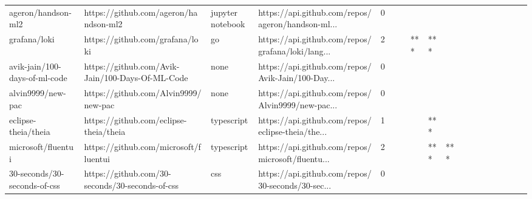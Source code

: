 \begin{tabular}{llllrlllllllllllll}
ageron/handson-ml2                                 &              https://github.com/ageron/handson-ml2 &  jupyter notebook &  https://api.github.com/repos/ageron/handson-ml... &       0 &         &        &           &                &                 &        &           &           &          &          &       &              &          \\
grafana/loki                                       &                    https://github.com/grafana/loki &                go &  https://api.github.com/repos/grafana/loki/lang... &       2 &         &        &       *** &            *** &                 &        &           &           &          &          &       &              &          \\
avik-jain/100-days-of-ml-code                      &   https://github.com/Avik-Jain/100-Days-Of-ML-Code &              none &  https://api.github.com/repos/Avik-Jain/100-Day... &       0 &         &        &           &                &                 &        &           &           &          &          &       &              &          \\
alvin9999/new-pac                                  &               https://github.com/Alvin9999/new-pac &              none &  https://api.github.com/repos/Alvin9999/new-pac... &       0 &         &        &           &                &                 &        &           &           &          &          &       &              &          \\
eclipse-theia/theia                                &             https://github.com/eclipse-theia/theia &        typescript &  https://api.github.com/repos/eclipse-theia/the... &       1 &         &        &           &            *** &                 &        &           &           &          &          &       &              &          \\
microsoft/fluentui                                 &              https://github.com/microsoft/fluentui &        typescript &  https://api.github.com/repos/microsoft/fluentu... &       2 &         &        &           &            *** &             *** &        &           &           &          &          &       &              &          \\
30-seconds/30-seconds-of-css                       &    https://github.com/30-seconds/30-seconds-of-css &               css &  https://api.github.com/repos/30-seconds/30-sec... &       0 &         &        &           &                &                 &        &           &           &          &          &       &              &          \\

\end{tabular}
